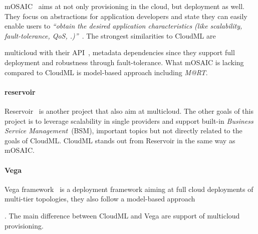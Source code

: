 mOSAIC~\cite{portable:petcu12} aims at not only provisioning in the cloud, but deployment as well.
They focus on abstractions for application developers and state they can easily enable users to
\emph{``obtain the desired application characteristics (like
scalability, fault-tolerance, QoS, \etc.)''}~\cite{architecturing:petcu11}.
The strongest similarities to CloudML are 
\begin{ii}\iitem multicloud with their API~\cite{architecturing:petcu11},
\iitem metadata dependencies since they support full deployment and
\iitem robustness through fault-tolerance.
What mOSAIC is lacking compared to CloudML is model-based approach including \emph{M@RT}.

\paragraph{reservoir}

Reservoir~\cite{reservoir:rochweger09} is another project that also aim at
\iitem multicloud. The other goals of this project is to leverage 
scalability in single providers and support built-in \emph{Business Service Management}~(BSM),
important topics but not directly related to the goals of CloudML.
CloudML stands out from Reservoir in the same way as mOSAIC.

\paragraph{Vega}
Vega framework~\cite{simplifying:chieu10} is a deployment framework aiming 
at full cloud deployments of multi-tier topologies, they also follow a \iitem model-based 
approach\end{ii}. The main difference between CloudML and Vega are support of multicloud provisioning.



